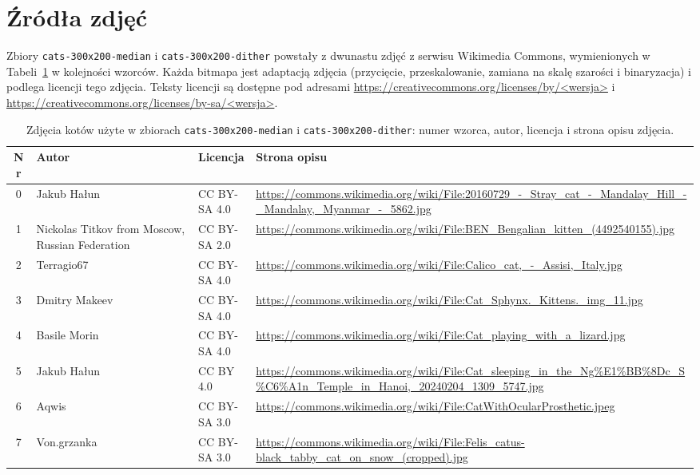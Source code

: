 \section{Źródła zdjęć}
\label{app:zrodla-zdjec}

Zbiory \texttt{cats-300x200-median} i \texttt{cats-300x200-dither} powstały z dwunastu zdjęć z serwisu Wikimedia Commons, wymienionych w Tabeli~\ref{tab:zrodla-zdjec} w kolejności wzorców. Każda bitmapa jest adaptacją zdjęcia (przycięcie, przeskalowanie, zamiana na skalę szarości i binaryzacja) i podlega licencji tego zdjęcia. Teksty licencji są dostępne pod adresami \url{https://creativecommons.org/licenses/by/<wersja>} i \url{https://creativecommons.org/licenses/by-sa/<wersja>}.

\begin{table}[H]
    \centering
    \caption{Zdjęcia kotów użyte w zbiorach \texttt{cats-300x200-median} i \texttt{cats-300x200-dither}: numer wzorca, autor, licencja i strona opisu zdjęcia.}
    \label{tab:zrodla-zdjec}
    \footnotesize
    \begin{tabularx}{\textwidth}{c >{\raggedright\arraybackslash}p{3.4cm} l >{\raggedright\arraybackslash}X}
        \toprule
        Nr & Autor & Licencja & Strona opisu \\
        \midrule
        0 & Jakub Hałun & CC BY-SA 4.0 & \url{https://commons.wikimedia.org/wiki/File:20160729_-_Stray_cat_-_Mandalay_Hill_-_Mandalay,_Myanmar_-_5862.jpg} \\
        1 & Nickolas Titkov from Moscow, Russian Federation & CC BY-SA 2.0 & \url{https://commons.wikimedia.org/wiki/File:BEN_Bengalian_kitten_(4492540155).jpg} \\
        2 & Terragio67 & CC BY-SA 4.0 & \url{https://commons.wikimedia.org/wiki/File:Calico_cat,_-_Assisi,_Italy.jpg} \\
        3 & Dmitry Makeev & CC BY-SA 4.0 & \url{https://commons.wikimedia.org/wiki/File:Cat_Sphynx._Kittens._img_11.jpg} \\
        4 & Basile Morin & CC BY-SA 4.0 & \url{https://commons.wikimedia.org/wiki/File:Cat_playing_with_a_lizard.jpg} \\
        5 & Jakub Hałun & CC BY 4.0 & \url{https://commons.wikimedia.org/wiki/File:Cat_sleeping_in_the_Ng\%E1\%BB\%8Dc_S\%C6\%A1n_Temple_in_Hanoi,_20240204_1309_5747.jpg} \\
        6 & Aqwis & CC BY-SA 3.0 & \url{https://commons.wikimedia.org/wiki/File:CatWithOcularProsthetic.jpeg} \\
        7 & Von.grzanka & CC BY-SA 3.0 & \url{https://commons.wikimedia.org/wiki/File:Felis_catus-black_tabby_cat_on_snow_(cropped).jpg} \\

\end{tabularx}
\end{table}
